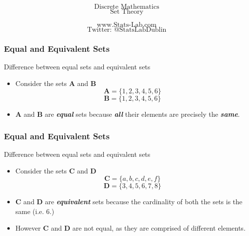 \documentclass{beamer}
\begin{document}

\begin{frame}
\Huge
\[\mbox{Discrete Mathematics}\]
\Huge
\[\mbox{Set Theory}\]

\Large
\[\mbox{www.Stats-Lab.com}\]
\Large
\[\mbox{Twitter: @StatsLabDublin}\]

\end{frame}

\begin{frame}
\frametitle{Equal and Equivalent Sets}
\Large
\vspace{-1cm}
Difference between equal sets and equivalent sets

\begin{itemize}
\item Consider the sets \textbf{A} and \textbf{B}
\[ \boldsymbol{A} = \{ 1,2,3,4,5,6 \} \] 
\[ \boldsymbol{B} = \{1,2,3,4,5,6 \} \]
\vspace{0.2cm}
\item \textbf{A} and \textbf{B} are \textit{\textbf{equal}} sets because \textit{\textbf{all}} their
elements are precisely the \textit{\textbf{same}}.
\end{itemize}


\end{frame}

\begin{frame}
\frametitle{Equal and Equivalent Sets}
\Large
\vspace{-0.7cm}
Difference between equal sets and equivalent sets

\begin{itemize}
\item Consider the sets \textbf{C} and \textbf{D}
\[ \boldsymbol{C} = \{a,b,c,d,e,f\} \]  \[ \boldsymbol{D} = \{3,4,5,6,7,8\} \]
\vspace{0.2cm}
\item \textbf{C} and \textbf{D} are \textit{\textbf{equivalent}} sets
because the cardinality of both the sets is the same (i.e. 6.)
\item However \textbf{C} and \textbf{D} are not equal, as they are comprised of different elements.
\end{itemize}





\end{frame}
\end{document}
